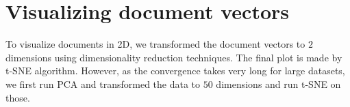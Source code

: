 \section{Visualizing document vectors}
To visualize documents in 2D, we transformed the document vectors to $2$ dimensions using dimensionality reduction techniques. The final plot is made by t-SNE algorithm. However, as the convergence takes very long for large datasets, we first run PCA and transformed the data to $50$ dimensions and run t-SNE on those.
